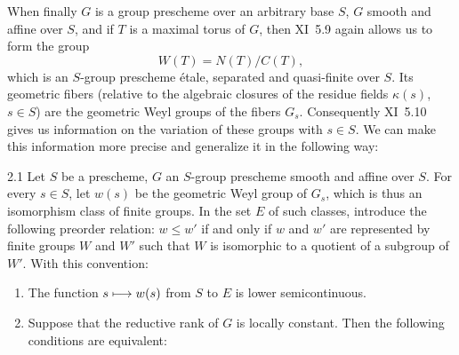 When finally $G$ is a group prescheme over an arbitrary base $S$, $G$ smooth and affine over $S$, and if $T$ is a maximal torus of $G$, then XI~5.9 again allows us to form the group
\[
W(T)=N(T)/C(T),
\]
which is an $S$-group prescheme étale, separated and quasi-finite over $S$. Its geometric fibers (relative to the algebraic closures of the residue fields $\kappa(s)$, $s\in S$) are the geometric Weyl groups of the fibers $G_s$. Consequently XI~5.10 gives us information on the variation of these groups with $s\in S$. We can make this information more precise and generalize it in the following way:
\begin{theorem}{2.1}\label{XII.2.1}
Let $S$ be a prescheme, $G$ an $S$-group prescheme smooth and affine over $S$. For every $s\in S$, let $w(s)$ be the geometric Weyl group of $G_s$, which is thus an isomorphism class of finite groups. In the set $E$ of such classes, introduce the following preorder relation: $w\le w'$ if and only if $w$ and $w'$ are represented by finite groups $W$ and $W'$ such that $W$ is isomorphic to a quotient of a subgroup of $W'$. With this convention:
\begin{enumerate}[label=\alph*)]
\item The function $s\longmapsto w(s)$ from $S$ to $E$ is lower semicontinuous.
\item Suppose that the reductive rank of $G$ is locally constant. Then the following conditions are equivalent:
\end{enumerate}
\end{theorem}
